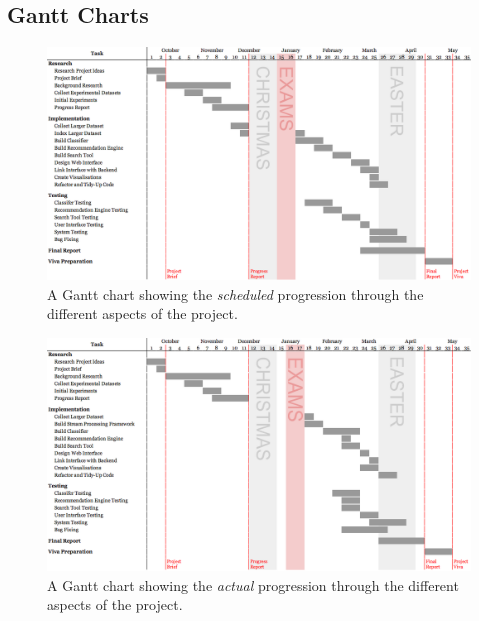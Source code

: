 \documentclass[11pt,a4paper]{report}
\begin{document}
\begin{subappendices}
\begin{landscape}
    \section{Gantt Charts}
    \label{appendix:gantt}
    \begin{figure}[H]
        \centering
        \includegraphics[height=0.86\textwidth]{gantt.png}
        \caption*{A Gantt chart showing the \emph{scheduled} progression through the different aspects of the project.}
    \end{figure}

    \begin{figure}[H]
        \centering
        \includegraphics[height=0.86\textwidth]{gantt-actual.png}
        \caption*{A Gantt chart showing the \emph{actual} progression through the different aspects of the project.}
    \end{figure}
\end{landscape}
\pagebreak


\end{subappendices}
\end{document}
